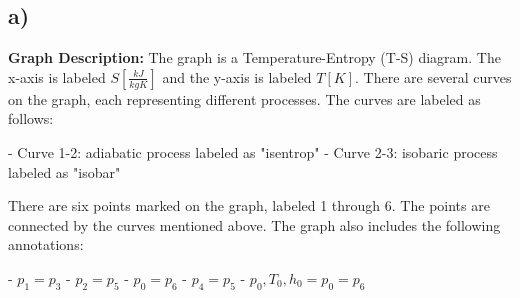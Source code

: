 

\subsection*{a)}

\textbf{Graph Description:} The graph is a Temperature-Entropy (T-S) diagram. The x-axis is labeled $S \left[\frac{kJ}{kgK}\right]$ and the y-axis is labeled $T[K]$. There are several curves on the graph, each representing different processes. The curves are labeled as follows:

- Curve 1-2: adiabatic process labeled as "isentrop"
- Curve 2-3: isobaric process labeled as "isobar"

There are six points marked on the graph, labeled 1 through 6. The points are connected by the curves mentioned above. The graph also includes the following annotations:

- $p_1 = p_3$
- $p_2 = p_5$
- $p_0 = p_6$
- $p_4 = p_5$
- $p_0, T_0, h_0 = p_0 = p_6$